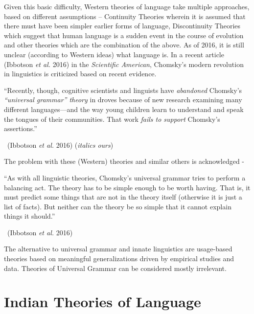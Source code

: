 Given this basic difficulty, Western theories of language take multiple approaches, based on different assumptions – Continuity Theories wherein it is assumed that there must have been simpler earlier forms of language, Discontinuity Theories which suggest that human language is a sudden event in the course of evolution and other theories which are the combination of the above. As of 2016, it is still unclear (according to Western ideas) what language is. In a recent article (Ibbotson \textit{et al.} 2016) in the \textit{Scientific American}, Chomsky’s modern revolution in linguistics is criticized based on recent evidence.

\begin{myquote}
“Recently, though, cognitive scientists and linguists have \textit{abandoned} Chomsky’s \textit{“universal grammar” theory} in droves because of new research examining many different languages—and the way young children learn to understand and speak the tongues of their communities. That work \textit{fails to support} Chomsky’s assertions.”

~\hfill (Ibbotson \textit{et al.} 2016) (\textit{italics ours})
\end{myquote}

The problem with these (Western) theories and similar others is acknowledged -

\begin{myquote}
“As with all linguistic theories, Chomsky’s universal grammar tries to perform a balancing act. The theory has to be simple enough to be worth having. That is, it must predict some things that are not in the theory itself (otherwise it is just a list of facts). But neither can the theory be so simple that it cannot explain things it should.”

~\hfill (Ibbotson \textit{et al.} 2016)
\end{myquote}

The alternative to universal grammar and innate linguistics are usage-based theories based on meaningful generalizations driven by empirical studies and data. Theories of Universal Grammar can be considered mostly irrelevant. 

\vskip -26pt


\section*{Indian Theories of Language}

